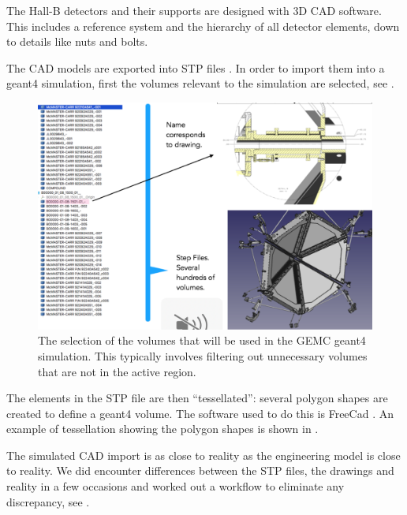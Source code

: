 The Hall-B detectors and their supports are designed with 3D CAD software. This includes a reference system and the
hierarchy of all detector elements, down to details like nuts and bolts.

The CAD models are exported into STP files \cite{stepFiles}.
In order to import them into a geant4 simulation, first the volumes relevant to the simulation are selected, see .

\begin{figure}
	\centering
	\includegraphics[width=0.98\columnwidth,keepaspectratio]{img/cadSelection.png}
	\caption{The selection of the volumes that will be used in the GEMC geant4 simulation.
             This typically involves filtering out unnecessary volumes that are not in the active region.}
	\label{fig:cadSelection}
\end{figure}

The elements in the STP file are then ``tessellated'': several polygon shapes are created to define a geant4 volume.
The software used to do this is FreeCad \cite{freeCad}. An example of tessellation showing the polygon shapes
is shown in .

The simulated CAD import is as close to reality as the engineering model is close to reality.
We did encounter differences between the STP files, the drawings and reality in a few occasions and worked
out a workflow to eliminate any discrepancy, see .


